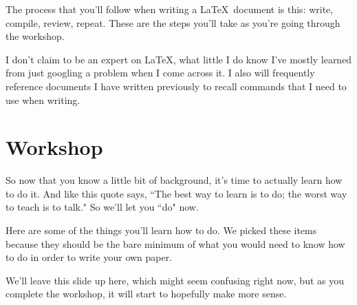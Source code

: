 \documentclass[12pt]{article}
\begin{document}
	The process that you'll follow when writing a \LaTeX\ document
	is this: write, compile, review, repeat. These are the 
	steps you'll take as you're going through the workshop.

	I don't claim to be an expert on \LaTeX, what little I do know
	I've mostly learned from just googling a problem when I come
	across it. I also will frequently reference documents I have
	written previously to recall commands that I need to use when
	writing.

\section{Workshop}
	So now that you know a little bit of background, it's time to
	actually learn how to do it. And like this quote says, ``The
	best way to learn is to do; the worst way to teach is to talk."
	So we'll let you ``do" now. 

	Here are some of the things you'll learn how to do. We picked
	these items because they should be the bare minimum of what you
	would need to know how to do in order to write your own paper.

	We'll leave this slide up here, which might seem confusing
	right now, but as you complete the workshop, it will start 
	to hopefully make more sense.
\end{document}
